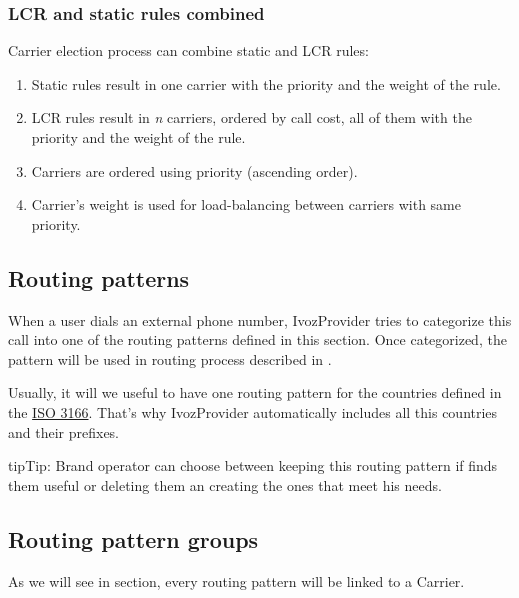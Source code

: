 \documentclass[letterpaper,10pt,english]{sphinxmanual}
\begin{document}
\subsubsection{LCR and static rules combined}
\label{administration_portal/brand/routing/outgoing_routings:lcr-and-static-rules-combined}
Carrier election process can combine static and LCR rules:
\begin{enumerate}
\item {} 
Static rules result in one carrier with the priority and the weight of the rule.

\item {} 
LCR rules result in \emph{n} carriers, ordered by call cost, all of them with the priority and the weight of the rule.

\item {} 
Carriers are ordered using priority (ascending order).

\item {} 
Carrier's weight is used for load-balancing between carriers with same priority.

\end{enumerate}


\subsection{Routing patterns}
\label{administration_portal/brand/routing/routing_patterns::doc}\label{administration_portal/brand/routing/routing_patterns:routing-patterns}\label{administration_portal/brand/routing/routing_patterns:id1}
When a user dials an external phone number, IvozProvider tries to categorize
this call into one of the routing patterns defined in this section. Once categorized,
the pattern will be used in routing process described in {\hyperref[administration_portal/brand/routing/outgoing_routings:outgoing\string-routings]{}}.

Usually, it will we useful to have one routing pattern for the countries
defined in the \href{https://en.wikipedia.org/wiki/ISO\_3166}{ISO 3166}. That's why IvozProvider automatically
includes all this countries and their prefixes.

\begin{notice}{tip}{Tip:}
Brand operator can choose between keeping this routing pattern if
finds them useful or deleting them an creating the ones that meet his needs.
\end{notice}


\subsection{Routing pattern groups}
\label{administration_portal/brand/routing/routing_patterns_groups::doc}\label{administration_portal/brand/routing/routing_patterns_groups:routing-pattern-groups}
As we will see in {\hyperref[administration_portal/brand/routing/outgoing_routings:outgoing\string-routings]{}} section, every routing
pattern will be linked to a Carrier.
\end{document}
